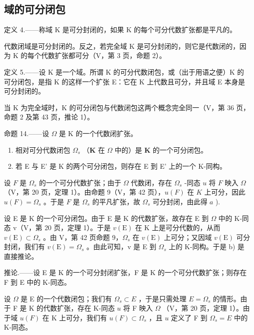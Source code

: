 \subsection{域的可分闭包}

定义 4.——称域 K 是可分封闭的，如果 K 的每个可分代数扩张都是平凡的。

代数闭域是可分封闭的。反之，若完全域 K 是可分封闭的，则它是代数闭的，因为 K 的每个代数扩张都可分（V，第 3 页，命题 2）。

定义 5.——设 K 是一个域。所谓 K 的可分代数闭包，或（出于用语之便）K 的可分闭包，是指 K 的这样一个扩张 E：它在 K 上代数且可分，并且域 E 本身是可分封闭的。

当 K 为完全域时，K 的可分闭包与代数闭包这两个概念完全同一（V，第 36 页，命题 2 及第 43 页，推论 1）。

命题 14.——设 \(\Omega\) 是 K 的一个代数闭扩张。

\begin{enumerate}
\def\labelenumi{\alph{enumi})}
\item
  相对可分代数闭包 \(\Omega_s\) （\(\mathbf{K}\) 在 \(\Omega\) 中的）是 \(\mathbf{K}\) 的一个可分闭包。
\item
  若 E 与 E' 是 K 的两个可分闭包，则存在 E 到 E' 上的一个 K-同构。
\end{enumerate}

设 \(F\) 是 \(\Omega_s\) 的一个可分代数扩张；由于 \(\Omega\) 代数闭，存在 \(\Omega_s\) -同态 \(u\) 将 \(F\) 映入 \(\Omega\) （V，第 20 页，定理 1）。由命题 9（V，第 42 页），\(u(F)\) 在 \(K\) 上可分，因此 \(u(F) = \Omega_s\) 。于是 \(F\) 是 \(\Omega_s\) 的平凡扩张，故 \(\Omega_s\) 可分封闭，由此得 \(a\) ).

设 E 是 K 的一个可分闭包。由于 E 是 K 的代数扩张，故存在 E 到 \(\Omega\) 中的 K-同态 v（V，第 20 页，定理 1）。于是 \(v(\mathrm{E})\) 在 K 上是可分代数的，从而 \(v(\mathrm{E}) \subset \Omega_{s}\) 。由 V，第 42 页命题 9，\(\Omega_{s}\) 在 \(v(\mathrm{E})\) 上可分；又因域 \(v(\mathrm{E})\) 可分封闭，我们有 \(v(\mathrm{E}) = \Omega_{s}\) 。由此可知，v 是 E 到 \(\Omega_{s}\) 上的 K-同构。于是 b) 是直接推论。

推论.——设 E 是 K 的一个可分封闭扩张，F 是 K 的一个可分代数扩张；则存在 F 到 E 中的 K-同态。

设 \(\Omega\) 是 E 的一个代数闭包；我们有 \(\Omega_s \subset E\) ，于是只需处理 \(E = \Omega_s\) 的情形。由于 F 是 K 的代数扩张，存在 K-同态 \(u\) 将 F 映入 \(\Omega\) （V，第 20 页，定理 1）。由于域 \(u(F)\) 在 K 上可分，我们有 \(u(F) \subset \Omega_s\) ，且 \(u\) 定义了 F 到 \(\Omega_s = E\) 中的 K-同态。

